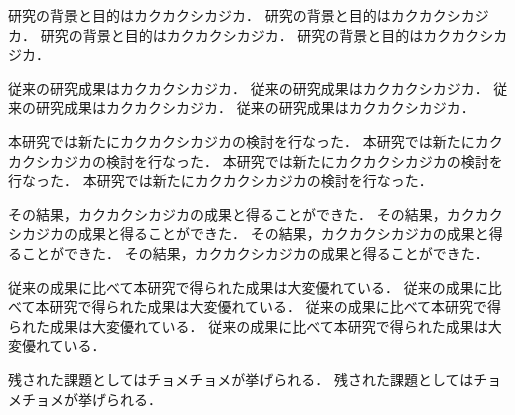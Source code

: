 ﻿研究の背景と目的はカクカクシカジカ．
研究の背景と目的はカクカクシカジカ．
研究の背景と目的はカクカクシカジカ．
研究の背景と目的はカクカクシカジカ．

従来の研究成果はカクカクシカジカ．
従来の研究成果はカクカクシカジカ．
従来の研究成果はカクカクシカジカ．
従来の研究成果はカクカクシカジカ．

本研究では新たにカクカクシカジカの検討を行なった．
本研究では新たにカクカクシカジカの検討を行なった．
本研究では新たにカクカクシカジカの検討を行なった．
本研究では新たにカクカクシカジカの検討を行なった．

その結果，カクカクシカジカの成果と得ることができた．
その結果，カクカクシカジカの成果と得ることができた．
その結果，カクカクシカジカの成果と得ることができた．
その結果，カクカクシカジカの成果と得ることができた．

従来の成果に比べて本研究で得られた成果は大変優れている．
従来の成果に比べて本研究で得られた成果は大変優れている．
従来の成果に比べて本研究で得られた成果は大変優れている．
従来の成果に比べて本研究で得られた成果は大変優れている．

残された課題としてはチョメチョメが挙げられる．
残された課題としてはチョメチョメが挙げられる．
